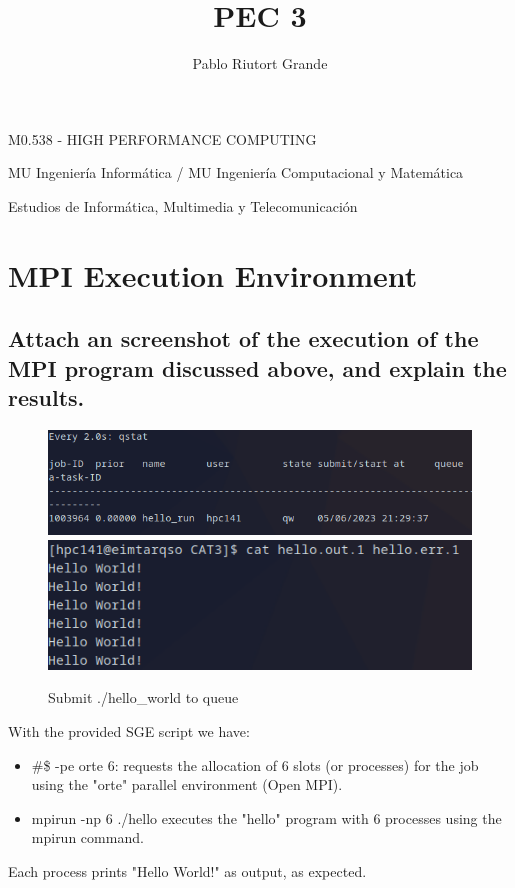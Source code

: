 \documentclass[11pt]{article}
\title{PEC 3}
\begin{document}
    \author{Pablo Riutort Grande}
    \maketitle
  
    
M0.538 - HIGH PERFORMANCE COMPUTING

MU Ingeniería Informática / MU Ingeniería Computacional y Matemática

Estudios de Informática, Multimedia y Telecomunicación


    \newpage


\hypertarget{1}{%
\section{MPI Execution Environment}\label{1}}

\subsection*{Attach an screenshot of the execution of the MPI program discussed above, and explain the results.}
\begin{figure}[h!]
    \centering
    \includegraphics{hello_world_queue.png}
    \includegraphics[scale=0.7]{hello_world_output.png}
    \caption*{Submit ./hello\_world to queue}
    \label{fig:1}
\end{figure}

With the provided SGE script we have:
\begin{itemize}
    \item \#\$ -pe orte 6: requests the allocation of 6 slots (or processes) for the job using the "orte" parallel environment (Open MPI).
    \item mpirun -np 6 ./hello executes the "hello" program with 6 processes using the mpirun command.
\end{itemize}
Each process prints "Hello World!" as output, as expected.
\end{document}
